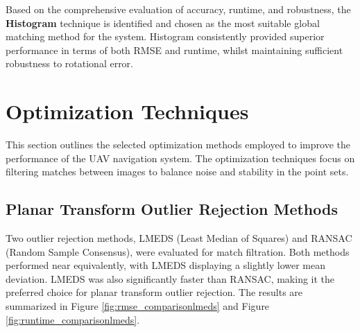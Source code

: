 Based on the comprehensive evaluation of accuracy, runtime, and robustness, the \textbf{Histogram} technique is identified and chosen as the most suitable global matching method for the system. Histogram consistently provided superior performance in terms of both RMSE and runtime, whilst maintaining sufficient robustness to rotational error. 




\section{Optimization Techniques}

This section outlines the selected optimization methods employed to improve the performance of the UAV navigation system. The optimization techniques focus on filtering matches between images to balance noise and stability in the point sets. 


\subsection{Planar Transform Outlier Rejection Methods}

Two outlier rejection methods, LMEDS (Least Median of Squares) and RANSAC (Random Sample Consensus), were evaluated for match filtration. Both methods performed near equivalently, with LMEDS displaying a slightly lower mean deviation. LMEDS was also significantly faster than RANSAC, making it the preferred choice for planar transform outlier rejection. The results are summarized in Figure \ref{fig:rmse_comparisonlmeds} and Figure \ref{fig:runtime_comparisonlmeds}.

